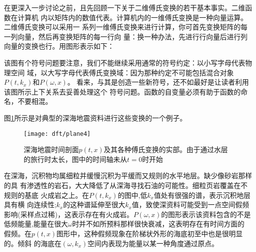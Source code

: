 在更深入一步讨论之前，且先回顾一下关于二维傅氏变换的若干基本事实。二维函数在计算机
内以矩阵内的数值代表。计算机内的一维傅氏变换是一种向量运算。二维傅氏变换可以采用一
系列一维傅氏变换来进行计算，你可首先变换矩阵的每一列向量，然后再变换矩阵的每一行向
量：换一种办法，先进行行向量后进行列向量的变换也行。用图形表示如下：


该图有个符号问题要注意，我们不能继续采用通常的符号约定：以小写字母代表物理空间
域，以大写字母代表傅氏变换域：因为那种约定不可能包括混合对象$P(t,k_{x})$和$P(\omega,x)$。
看来，与其是创造一些新符号，还不如最好是让读者利用该图所示上下关系去妥善处理这个
符号问题。函数的自变量必须有助于函数的命名，不要相混。

图\ref{fig:dft/plane4}所示是对典型的深海地震资料进行这些变换的一个例子。
\begin{figure}[H]
\centering
\texttt{[image: dft/plane4]}
\caption[plane4]{深海地震时间剖面$p(t,x)$及其各种傅氏变换的实部。由于通过水层
的旅行时太长，图中的时间轴未从$t=0$时开始}
\label{fig:dft/plane4}
\end{figure}

在深海，沉积物均属细粒并缓慢沉积为平缓而又规则的水平地层。缺少像砂岩那样的具
有渗透性的岩石，大大降低了从深海寻找石油的可能性。细粒页岩覆盖在不规则的基底
火成岩之上。在$P(t,k_{x})$的图中,低$k_{x}$值处有很强的谱，表示沉积地层具有横
向连续性;$k_{x}$的这种谱延伸至很大$k_{x}$值，致使深资料可能受到一点空间假频
影响(采样点过稀)，这表示存在有火成岩。$P(\omega,x)$的图形表示该资料包含的不是
低频能量,能量在很大$\omega$时并不如所预料那样很快衰减，这表明存在有时间方面的
假频。在$p(t,x)$图形中，这种假频现象在阶梯状外形的海底初至中也是很明显的。倾斜
的海底在$(\omega,k_{x})$空间内表现为能量以某一种角度通过原点。

